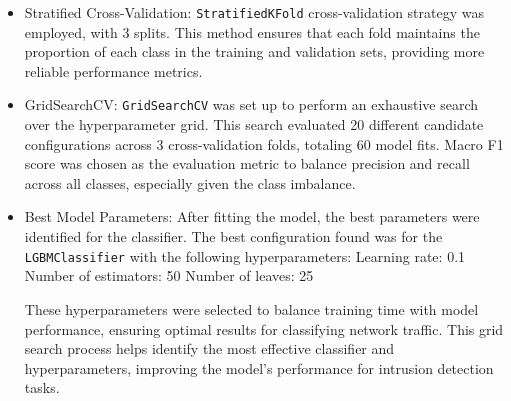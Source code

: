 \documentclass[conference]{IEEEtran}
\begin{document}
	\begin{itemize}
		\item Stratified Cross-Validation: \texttt{StratifiedKFold} cross-validation strategy was employed, with 3 splits. This method ensures that each fold maintains the proportion of each class in the training and validation sets, providing more reliable performance metrics.
		\item GridSearchCV: \texttt{GridSearchCV} was set up to perform an exhaustive search over the hyperparameter grid. This search evaluated 20 different candidate configurations across 3 cross-validation folds, totaling 60 model fits. Macro F1 score was chosen as the evaluation metric to balance precision and recall across all classes, especially given the class imbalance.
		\item Best Model Parameters: After fitting the model, the best parameters were identified for the classifier. The best configuration found was for the \texttt{LGBMClassifier} with the following hyperparameters:
		\subitem Learning rate: 0.1
		\subitem Number of estimators: 50
		\subitem Number of leaves: 25
		
		These hyperparameters were selected to balance training time with model performance, ensuring optimal results for classifying network traffic. This grid search process helps identify the most effective classifier and hyperparameters, improving the model’s performance for intrusion detection tasks.
	\end{itemize}
	
\end{document}
